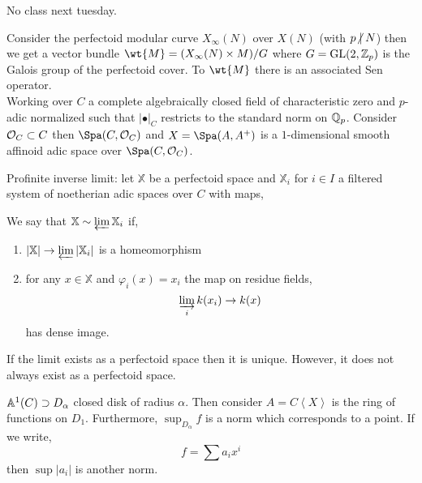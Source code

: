 \documentclass[12pt]{article}
\begin{document}
\begin{rmk}
No class next tuesday.
\end{rmk}

Consider the perfectoid modular curve $X_{\infty}(N)$ over $X(N)$ (with $p \ndivides N$) then we get a vector bundle $\wt{M} = (X_\infty(N) \times M) / G$ where $G = \mathrm{GL}(2, \mathbb{Z}_p)$ is the Galois group of the perfectoid cover. To $\wt{M}$ there is an associated Sen operator. 
\bigskip\\
Working over $C$ a complete algebraically closed field of characteristic zero and $p$-adic normalized such that $| \bullet |_C$ restricts to the standard norm on $\mathbb{Q}_p$. Consider $\mathcal{O}_{C} \subset C$ then $\Spa(C, \struct{C})$ and $X = \Spa(A, A^+)$ is a $1$-dimensional smooth affinoid adic space over $\Spa(C, \struct{C})$. 

\begin{defn}
Profinite inverse limit: let $\mathbb{X}$ be a perfectoid space and $\mathbb{X}_i$ for $i \in I$ a filtered system of noetherian adic spaces over $C$ with maps,
\begin{center}
\end{center}
We say that $\mathbb{X} \sim \varprojlim \mathbb{X}_i$ if,
\begin{enumerate}
\item $|\mathbb{X}| \to \varprojlim | \mathbb{X}_i |$ is a homeomorphism
\item for any $x \in \mathbb{X}$ and $\varphi_i(x) = x_i$ the map on residue fields,
\[ \varinjlim_i k(x_i) \to k(x) \]
has dense image.
\end{enumerate}
\end{defn}

\begin{rmk}
If the limit exists as a perfectoid space then it is unique. However, it does not always exist as a perfectoid space. 
\end{rmk}

\begin{example}
$\mathbb{A}^1(C) \supset D_\alpha$ closed disk of radius $\alpha$. Then consider $A = C \left< X \right>$ is the ring of functions on $D_1$. Furthermore, $\sup_{D_\alpha} f$ is a norm which corresponds to a point. If we write,
\[ f = \sum a_i x^i \]
then $\sup |a_i|$ is another norm. 
\end{example}
\end{document}
